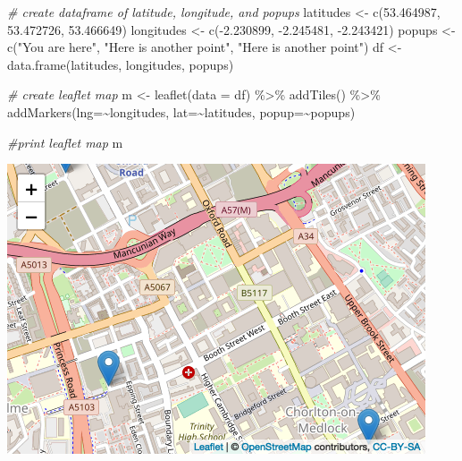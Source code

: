 \documentclass[
]{book}
\makeatletter
\newenvironment{Shaded}{\begin{snugshade}}{\end{snugshade}}
\newcommand{\AttributeTok}[1]{\textcolor[rgb]{0.61,0.61,0.61}{#1}}
\newcommand{\CommentTok}[1]{\textcolor[rgb]{0.37,0.37,0.37}{\textit{#1}}}
\newcommand{\FloatTok}[1]{\textcolor[rgb]{0.06,0.06,0.06}{#1}}
\newcommand{\FunctionTok}[1]{\textcolor[rgb]{0,0,0}{#1}}
\newcommand{\NormalTok}[1]{#1}
\newcommand{\OtherTok}[1]{\textcolor[rgb]{0.37,0.37,0.37}{#1}}
\newcommand{\SpecialCharTok}[1]{\textcolor[rgb]{0,0,0}{#1}}
\newcommand{\StringTok}[1]{\textcolor[rgb]{0.5,0.5,0.5}{#1}}
\newenvironment{kframe}{%
\medskip{}
\setlength{\fboxsep}{.8em}
 \def\at@end@of@kframe{}%
 \ifinner\ifhmode%
  \def\at@end@of@kframe{\end{minipage}}%
  \begin{minipage}{\columnwidth}%
 \fi\fi%
 \def\FrameCommand##1{\hskip\@totalleftmargin \hskip-\fboxsep
 \colorbox{shadecolor}{##1}\hskip-\fboxsep
     \hskip-\linewidth \hskip-\@totalleftmargin \hskip\columnwidth}%
 \MakeFramed {\advance\hsize-\width
   \@totalleftmargin\z@ \linewidth\hsize
   \@setminipage}}%
 {\par\unskip\endMakeFramed%
 \at@end@of@kframe}
\renewenvironment{Shaded}{\begin{kframe}}{\end{kframe}}
\makeatother
\begin{document}
\begin{Shaded}
\begin{Highlighting}[]
\CommentTok{\# create dataframe of latitude, longitude, and popups}
\NormalTok{latitudes }\OtherTok{\textless{}{-}} \FunctionTok{c}\NormalTok{(}\FloatTok{53.464987}\NormalTok{, }\FloatTok{53.472726}\NormalTok{, }\FloatTok{53.466649}\NormalTok{) }
\NormalTok{longitudes }\OtherTok{\textless{}{-}} \FunctionTok{c}\NormalTok{(}\SpecialCharTok{{-}}\FloatTok{2.230899}\NormalTok{, }\SpecialCharTok{{-}}\FloatTok{2.245481}\NormalTok{, }\SpecialCharTok{{-}}\FloatTok{2.243421}\NormalTok{) }
\NormalTok{popups }\OtherTok{\textless{}{-}} \FunctionTok{c}\NormalTok{(}\StringTok{"You are here"}\NormalTok{, }
           \StringTok{"Here is another point"}\NormalTok{, }
           \StringTok{"Here is another point"}\NormalTok{) }
\NormalTok{df }\OtherTok{\textless{}{-}} \FunctionTok{data.frame}\NormalTok{(latitudes, longitudes, popups)      }

\CommentTok{\# create leaflet map}
\NormalTok{m }\OtherTok{\textless{}{-}} \FunctionTok{leaflet}\NormalTok{(}\AttributeTok{data =}\NormalTok{ df) }\SpecialCharTok{\%\textgreater{}\%}
  \FunctionTok{addTiles}\NormalTok{()  }\SpecialCharTok{\%\textgreater{}\%}  
  \FunctionTok{addMarkers}\NormalTok{(}\AttributeTok{lng=}\SpecialCharTok{\textasciitilde{}}\NormalTok{longitudes, }\AttributeTok{lat=}\SpecialCharTok{\textasciitilde{}}\NormalTok{latitudes, }\AttributeTok{popup=}\SpecialCharTok{\textasciitilde{}}\NormalTok{popups)}

\CommentTok{\#print leaflet map}
\NormalTok{m  }
\end{Highlighting}
\end{Shaded}

\includegraphics{crime_mapping_files/figure-latex/unnamed-chunk-50-1.png}
\end{document}
